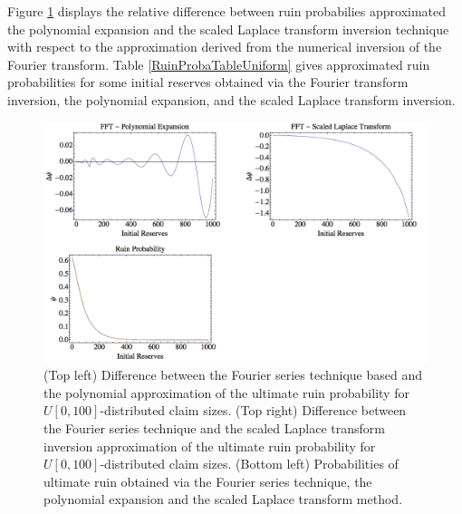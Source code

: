 Figure \ref{UniformCase} displays the relative difference between ruin probabilies approximated the polynomial expansion and the scaled Laplace transform inversion technique with respect to the approximation derived from the numerical inversion of the Fourier transform. Table \ref{RuinProbaTableUniform} gives approximated ruin probabilities for some initial reserves obtained via the Fourier transform inversion, the polynomial expansion, and the scaled Laplace transform inversion.
\begin{center}
	\begin{figure}[!h]
			\includegraphics[width=16cm]{Chapitre4/GraphUltimateRuinProbabilityUniformCase.png}
			\caption[Relative error and ruin probabilities for $U\left(0,100\right)$-distributed claim sizes ]{(Top left) Difference between the Fourier series technique based and the polynomial approximation of the ultimate ruin probability for $U\left[0,100\right]$-distributed claim sizes. (Top right) Difference between the Fourier series technique and the scaled Laplace transform inversion approximation of the ultimate ruin probability for $U\left[0,100\right]$-distributed claim sizes. (Bottom left) Probabilities of ultimate ruin obtained via the Fourier series technique,  the polynomial expansion and the scaled Laplace transform method.}\label{UniformCase}
	\end{figure}
\end{center}

